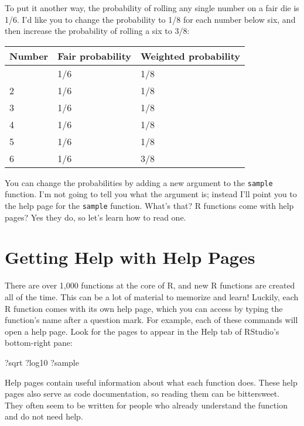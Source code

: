 \documentclass[
  letterpaper,
  DIV=11,
  numbers=noendperiod]{scrbook}
\newenvironment{Shaded}{\begin{snugshade}}{\end{snugshade}}
\newcommand{\NormalTok}[1]{\textcolor[rgb]{0.00,0.23,0.31}{#1}}
\begin{document}
To put it another way, the probability of rolling any single number on a
fair die is 1/6. I'd like you to change the probability to 1/8 for each
number below six, and then increase the probability of rolling a six to
3/8:

\begin{longtable}[]{@{}lll@{}}
\toprule\noalign{}
Number & Fair probability & Weighted probability \\
\midrule\noalign{}
\endhead
\bottomrule\noalign{}
\endlastfoot
1 & 1/6 & 1/8 \\
2 & 1/6 & 1/8 \\
3 & 1/6 & 1/8 \\
4 & 1/6 & 1/8 \\
5 & 1/6 & 1/8 \\
6 & 1/6 & 3/8 \\
\end{longtable}

You can change the probabilities by adding a new argument to the
\texttt{sample} function. I'm not going to tell you what the argument
is; instead I'll point you to the help page for the \texttt{sample}
function. What's that? R functions come with help pages? Yes they do, so
let's learn how to read one.

\section{Getting Help with Help
Pages}\label{getting-help-with-help-pages}

There are over 1,000 functions at the core of R, and new R functions are
created all of the time. This can be a lot of material to memorize and
learn! Luckily, each R function comes with its own help page, which you
can access by typing the function's name after a question mark. For
example, each of these commands will open a help page. Look for the
pages to appear in the Help tab of RStudio's bottom-right pane:

\begin{Shaded}
\begin{Highlighting}[]
\NormalTok{?sqrt}
\NormalTok{?log10}
\NormalTok{?sample}
\end{Highlighting}
\end{Shaded}

Help pages contain useful information about what each function does.
These help pages also serve as code documentation, so reading them can
be bittersweet. They often seem to be written for people who already
understand the function and do not need help.
\end{document}

